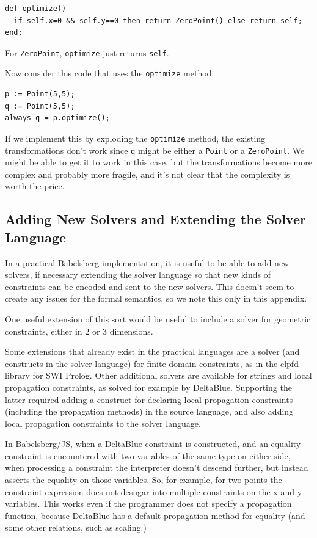 \documentclass{article}
\begin{document}
\begin{verbatim}
def optimize()
  if self.x=0 && self.y==0 then return ZeroPoint() else return self;
end;
\end{verbatim}

For \verb|ZeroPoint|, \verb|optimize| just returns \verb|self|.  

Now consider this code that uses the \verb|optimize| method:

\begin{verbatim}
p := Point(5,5);
q := Point(5,5);
always q = p.optimize();
\end{verbatim}

If we implement this by exploding the \verb|optimize| method, the
existing transformations don't work since \verb|q| might be either a
\verb|Point| or a \verb|ZeroPoint|.  We might be able to get it to
work in this case, but the transformations become more complex and
probably more fragile, and it's not clear that the complexity is worth
the price.

\subsection{Adding New Solvers and Extending the Solver Language}
\label{sec:adding-solvers}

In a practical Babelsberg implementation, it is useful to be able to
add new solvers, if necessary extending the solver language so that
new kinds of constraints can be encoded and sent to the new solvers.
This doesn't seem to create any issues for the formal semantics, so we
note this only in this appendix.

One useful extension of this sort would be useful to include a solver
for geometric constraints, either in 2 or 3 dimensions.

Some extensions that already exist in the practical languages are a
solver (and constructs in the solver language) for finite domain
constraints, as in the clpfd library for SWI Prolog.  Other additional
solvers are available for strings and local propagation constraints, as
solved for example by DeltaBlue.  Supporting the latter required adding a
construct for declaring local propagation constraints (including the
propagation methods) in the source language, and also adding local
propagation constraints to the solver language.

In Babelsberg/JS, when a DeltaBlue constraint is constructed, and an
equality constraint is encountered with two variables of the same type
on either side, when processing a constraint the interpreter doesn't
descend further, but instead asserts the equality on those
variables. So, for example, for two points the constraint expression
does not desugar into multiple constraints on the x and y
variables. This works even if the programmer does not specify a
propagation function, because DeltaBlue has a default propagation
method for equality (and some other relations, such as scaling.)
\end{document}
